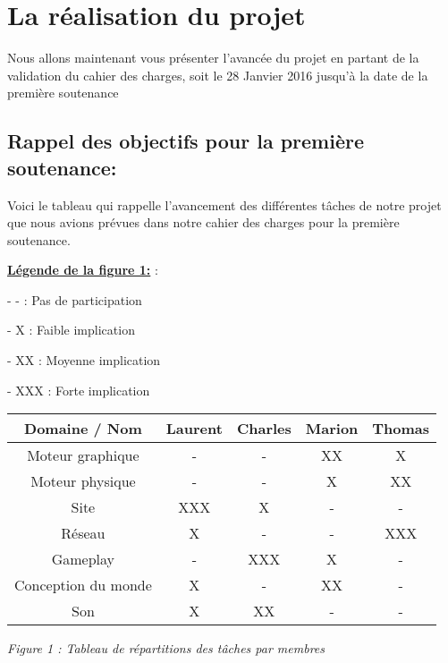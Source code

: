 \documentclass[a4paper]{article}
\begin{document}
\quad

\quad



\newpage


\section{La réalisation du projet}

\quad

    Nous allons maintenant vous présenter l’avancée du projet en partant de la validation du cahier des charges, soit le 28 Janvier 2016 jusqu’à la date de la première soutenance

	\subsection{Rappel des objectifs pour la première soutenance:}


    Voici le tableau qui rappelle l’avancement des différentes tâches de notre projet que nous avions prévues dans notre cahier des charges pour la première soutenance.

\quad

\underline{\textbf{Légende de la figure 1:}} : 

\quad
	   -  -     : Pas de participation

 \quad
	- X     : Faible implication

 \quad
	- XX   : Moyenne implication

 \quad
	- XXX : Forte implication 

\quad

\quad 

\begin{tabular}{|c||c|c|c|c|}
\hline Domaine / Nom & Laurent & Charles & Marion & Thomas \\ 
\hline Moteur graphique & - & - & XX & X\\
\hline Moteur physique & - & - & X & XX\\
\hline Site & XXX & X & - & -\\
\hline Réseau & X & - & - & XXX\\
\hline Gameplay & - & XXX & X & -\\
\hline Conception du monde & X & - & XX & -\\
\hline Son & X & XX & - & -\\
\hline
\end {tabular}

\quad

\begin{center}

\textit{Figure 1 : Tableau de répartitions des tâches par membres}

\end{center}
\end{document}
